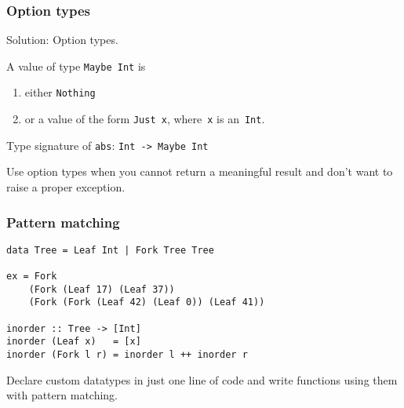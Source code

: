 \documentclass[14pt,compress,english,utf8,t]{beamer}
\begin{document}
\begin{frame}[fragile]\frametitle{Option types}
  Solution: Option types.
  \medskip
  \pause

  A value of type \texttt{Maybe Int} is
  \begin{enumerate}
    \item either \texttt{Nothing}
    \item or a value of the form \texttt{Just x}, where~\texttt{x} is
    an~\texttt{Int}.
  \end{enumerate}
  \medskip

  Type signature of \texttt{abs}:
  \texttt{Int -> Maybe Int}
  \medskip

  Use option types when you cannot return a meaningful result and don't want to
  raise a proper exception.
\end{frame}

\begin{frame}[fragile]\frametitle{Pattern matching}
  \begin{center}
    \scalebox{0.5}{}
  \end{center}

  \small
  \begin{verbatim}
data Tree = Leaf Int | Fork Tree Tree

ex = Fork
    (Fork (Leaf 17) (Leaf 37))
    (Fork (Fork (Leaf 42) (Leaf 0)) (Leaf 41))

inorder :: Tree -> [Int]
inorder (Leaf x)   = [x]
inorder (Fork l r) = inorder l ++ inorder r
  \end{verbatim}

  Declare custom datatypes in just one line of code and write functions using
  them with pattern matching.
\end{frame}
\end{document}
